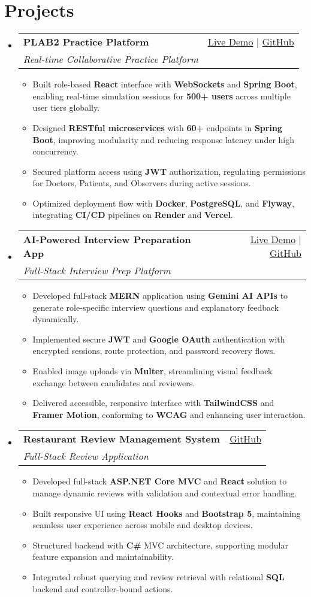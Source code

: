 \documentclass[letterpaper,11pt]{article}
\makeatletter
\newcommand{\resumeItem}[1]{\item\small{#1 \vspace{-2pt}}}
\newcommand{\resumeSubheading}[4]{
  \vspace{-1pt}\item
    \begin{tabular*}{0.97\textwidth}[t]{l@{\extracolsep{\fill}}r}
      \textbf{#1} & #2 \\
      \textit{\small#3} & \textit{\small #4} \\
    \end{tabular*}\vspace{-5pt}
}
\newcommand{\resumeSubHeadingListStart}{\begin{itemize}[leftmargin=*]}
\newcommand{\resumeSubHeadingListEnd}{\end{itemize}}
\newcommand{\resumeItemListStart}{\begin{itemize}}
\newcommand{\resumeItemListEnd}{\end{itemize}\vspace{-5pt}}
\makeatother
\begin{document}
\section{Projects}
  \resumeSubHeadingListStart
    \resumeSubheading
      {\textbf{PLAB2 Practice Platform}}{\href{https://plab2practice.com}{Live Demo} | \href{https://github.com/altansaid/plab2projectnew}{GitHub}}
      {Real-time Collaborative Practice Platform}{}
      \resumeItemListStart
        \resumeItem{Built role-based \textbf{React} interface with \textbf{WebSockets} and \textbf{Spring Boot}, enabling real-time simulation sessions for \textbf{500+ users} across multiple user tiers globally.}
        \resumeItem{Designed \textbf{RESTful microservices} with \textbf{60+} endpoints in \textbf{Spring Boot}, improving modularity and reducing response latency under high concurrency.}
        \resumeItem{Secured platform access using \textbf{JWT} authorization, regulating permissions for Doctors, Patients, and Observers during active sessions.}
        \resumeItem{Optimized deployment flow with \textbf{Docker}, \textbf{PostgreSQL}, and \textbf{Flyway}, integrating \textbf{CI/CD} pipelines on \textbf{Render} and \textbf{Vercel}.}
      \resumeItemListEnd

    \resumeSubheading
      {\textbf{AI-Powered Interview Preparation App}}{\href{https://interviewcoach-ai.vercel.app}{Live Demo} | \href{https://github.com/altansaid/interviewcoach-ai}{GitHub}}
      {Full-Stack Interview Prep Platform}{}
      \resumeItemListStart
        \resumeItem{Developed full-stack \textbf{MERN} application using \textbf{Gemini AI APIs} to generate role-specific interview questions and explanatory feedback dynamically.}
        \resumeItem{Implemented secure \textbf{JWT} and \textbf{Google OAuth} authentication with encrypted sessions, route protection, and password recovery flows.}
        \resumeItem{Enabled image uploads via \textbf{Multer}, streamlining visual feedback exchange between candidates and reviewers.}
        \resumeItem{Delivered accessible, responsive interface with \textbf{TailwindCSS} and \textbf{Framer Motion}, conforming to \textbf{WCAG} and enhancing user interaction.}
      \resumeItemListEnd

    \resumeSubheading
      {\textbf{Restaurant Review Management System}}{\href{https://github.com/altansaid/restaurantreviewmanagementsystem}{GitHub}}{Full-Stack Review Application}{}
      \resumeItemListStart
        \resumeItem{Developed full-stack \textbf{ASP.NET Core MVC} and \textbf{React} solution to manage dynamic reviews with validation and contextual error handling.}
        \resumeItem{Built responsive UI using \textbf{React Hooks} and \textbf{Bootstrap 5}, maintaining seamless user experience across mobile and desktop devices.}
        \resumeItem{Structured backend with \textbf{C\#} MVC architecture, supporting modular feature expansion and maintainability.}
        \resumeItem{Integrated robust querying and review retrieval with relational \textbf{SQL} backend and controller-bound actions.}
      \resumeItemListEnd
  \resumeSubHeadingListEnd
\end{document}
